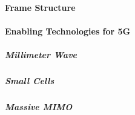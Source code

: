 \paragraph{Frame Structure}\label{par:Frame_Structure}
\paragraph{Enabling Technologies for 5G}\label{par:5G_Enabling_Technologies}
\subparagraph{Millimeter Wave}\label{subpar:Millimeter_Wave}
\subparagraph{Small Cells}\label{subpar:Small_Cells}
\subparagraph{Massive MIMO}\label{subpar:Massive_MIMO}

